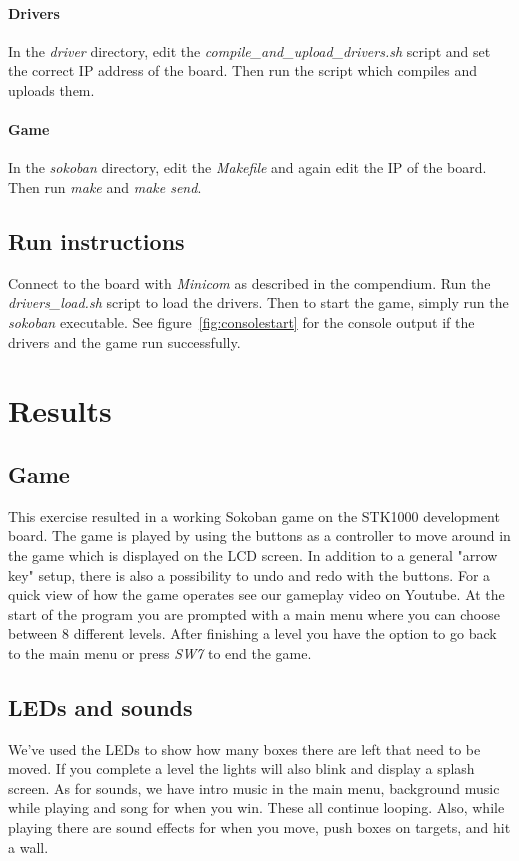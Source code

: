 \documentclass[a4paper,11pt]{article}
\begin{document}
\paragraph{Drivers}
In the \textit{driver} directory, edit the \textit{compile\_and\_upload\_drivers.sh} script and set the correct IP address of the board. Then run the script which compiles and uploads them.

\paragraph{Game}
In the \textit{sokoban} directory, edit the \textit{Makefile} and again edit the IP of the board. Then run \textit{make} and \textit{make send}.

\subsection{Run instructions}
Connect to the board with \textit{Minicom} as described in the compendium. Run the \textit{drivers\_load.sh} script to load the drivers. Then to start the game, simply run the \textit{sokoban} executable. See figure~\ref{fig:consolestart} for the console output if the drivers and the game run successfully. 

\section{Results}
\subsection{Game} 
This exercise resulted in a working Sokoban game on the STK1000 development board. The game is played by using the buttons as a controller to move around in the game which is displayed on the LCD screen. In addition to a general "arrow key" setup, there is also a possibility to undo and redo with the buttons. For a quick view of how the game operates see our gameplay video on Youtube\cite{youtube}. At the start of the program you are prompted with a main menu where you can choose between 8 different levels. After finishing a level you have the option to go back to the main menu or press \textit{SW7} to end the game.

\subsection{LEDs and sounds}
We've used the LEDs to show how many boxes there are left that need to be moved. If you complete a level the lights will also blink and display a splash screen. As for sounds, we have intro music in the main menu, background music while playing and song for when you win. These all continue looping. Also, while playing there are sound effects for when you move, push boxes on targets, and hit a wall.
\end{document}

